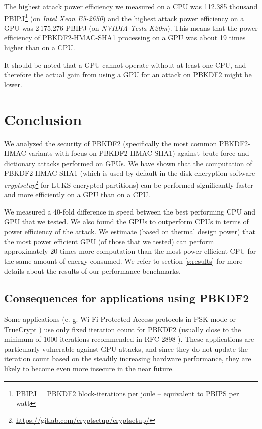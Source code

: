 \documentclass[12pt,oneside]{fithesis2}
\begin{document}
      The highest attack power efficiency we measured on a CPU was 112.385 thousand PBIPJ\footnote{PBIPJ = PBKDF2 block-iterations per joule -- equivalent to PBIPS per watt} (on \emph{Intel Xeon E5-2650}) and the highest attack power efficiency on a GPU was 2\,175.276 PBIPJ (on \emph{NVIDIA Tesla K20m}). This means that the power efficiency of PBKDF2-HMAC-SHA1 processing on a GPU was about 19 times higher than on a CPU.
      
      It should be noted that a GPU cannot operate without at least one CPU, and therefore the actual gain from using a GPU for an attack on PBKDF2 might be lower.
      
      
    \chapter{Conclusion}
      We analyzed the security of PBKDF2 (specifically the most common PBKDF2-HMAC variants with focus on PBKDF2-HMAC-SHA1) against brute-force and dictionary attacks performed on GPUs. We have shown that the computation of PBKDF2-HMAC-SHA1 (which is used by default in the disk encryption software \emph{cryptsetup}\footnote{\url{https://gitlab.com/cryptsetup/cryptsetup/}} for LUKS encrypted partitions) can be performed significantly faster and more efficiently on a GPU than on a CPU.
      
      We measured a 40-fold difference in speed between the best performing CPU and GPU that we tested. We also found the GPUs to outperform CPUs in terms of power efficiency of the attack. We estimate (based on thermal design power) that the most power efficient GPU (of those that we tested) can perform approximately 20 times more computation than the most power efficient CPU for the same amount of energy consumed. We refer to section \ref{s:results} for more details about the results of our performance benchmarks.
      
      \section{Consequences for applications using PBKDF2}
      Some applications (e. g. Wi-Fi Protected Access protocols in PSK mode \cite{rfc4764} or TrueCrypt \cite{truecrypt}) use only fixed iteration count for PBKDF2 (usually close to the minimum of 1000 iterations recommended in RFC 2898 \cite[section 4.2]{rfc2898}). These applications are particularly vulnerable against GPU attacks, and since they do not update the iteration count based on the steadily increasing hardware performance, they are likely to become even more insecure in the near future.
      
\end{document}
